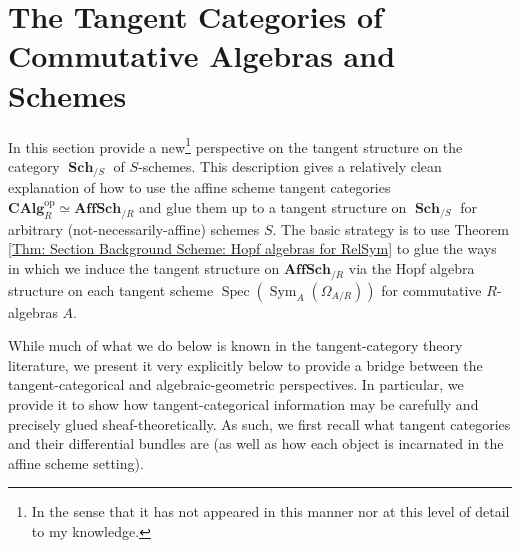 \documentclass{amsart}
\theoremstyle{definition}
\DeclareMathOperator{\Fscr}{\mathscr{F}}
\DeclareMathOperator{\Gscr}{\mathscr{G}}
\DeclareMathOperator{\Ocal}{\mathcal{O}}
\DeclareMathOperator{\sym}{Sym}
\DeclareMathOperator{\id}{id}
\DeclareMathOperator{\op}{op}
\DeclareMathOperator{\Spec}{Spec}
\newcommand{\CAlg}[1]{\mathbf{CAlg}_{#1}}
\newcommand{\Sym}[1]{\sym_{#1}}
\DeclareMathOperator{\Sch}{\mathbf{Sch}}
\DeclareMathOperator{\QCoh}{\mathbf{QCoh}}
\newcommand{\Mod}[1]{{#1}\textnormal{-}\mathbf{Mod}}
\newcommand{\Kah}[2]{\Omega_{{#1}/{#2}}}
\numberwithin{equation}{subsection}
\begin{document}


\section{The Tangent Categories of Commutative Algebras and Schemes}\label{Section: Tan Cats}
In this section provide a new\footnote{In the sense that it has not appeared in this manner nor at this level of detail to my knowledge.} perspective on the tangent structure on the category $\Sch_{/S}$ of $S$-schemes. This description gives a relatively clean explanation of how to use the affine scheme tangent categories $\CAlg{R}^{\op} \simeq \mathbf{AffSch}_{/R}$ and glue them up to a tangent structure on $\Sch_{/S}$ for arbitrary (not-necessarily-affine) schemes $S$. The basic strategy is to use Theorem \ref{Thm: Section Background Scheme: Hopf algebras for RelSym} to glue the ways in which we induce the tangent structure on $\mathbf{AffSch}_{/R}$ via the Hopf algebra structure on each tangent scheme $\Spec(\Sym{A}(\Kah{A}{R}))$ for commutative $R$-algebras $A$. 

While much of what we do below is known in the tangent-category theory literature, we present it very explicitly below to provide a bridge between the tangent-categorical and algebraic-geometric perspectives. In particular, we provide it to show how tangent-categorical information may be carefully and precisely glued sheaf-theoretically. As such, we first recall what tangent categories and their differential bundles are (as well as how each object is incarnated in the affine scheme setting).
\end{document}
